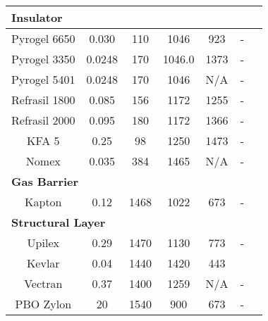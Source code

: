 \begin{table}[ht]
\begin{tabular}{|c|c|c|c|c|c|c|}
		\multicolumn{6}{|l|}{\textbf{Insulator}}			\\ \hline
		Pyrogel 6650      & 0.030                                                 & 110                                        & 1046                                            & 923    & - \\ \hline
		Pyrogel 3350      & 0.0248                                                & 170                                        & 1046.0                                         & 1373  	 & - \\ \hline
		Pyrogel 5401      & 0.0248                                                & 170                                        & 1046                                            & N/A  	 & - \\ \hline
		Refrasil 1800      & 0.085                                                 & 156                                        & 1172                                            & 1255 	 & - \\ \hline
		Refrasil 2000      & 0.095                                                 & 180                                        & 1172                                            & 1366 	 & - \\ \hline
		KFA 5             & 0.25                                                  & 98                                         & 1250                                            & 1473 	 & - \\ \hline
		Nomex             & 0.035                                                  & 384                                         & 1465                                            & N/A 	 & - \\ \hline
		\multicolumn{6}{|l|}{\textbf{Gas Barrier}}			\\ \hline
		Kapton            & 0.12                                                  & 1468                                       & 1022                                            & 673	 & - \\ \hline
		\multicolumn{6}{|l|}{\textbf{Structural Layer}}			\\ \hline
		Upilex            & 0.29                                                  & 1470                                       & 1130                                            & 773 	 & - \\ \hline
		Kevlar            & 0.04 & 1440                                       & 1420                                            & 443 	 & ~ \\ \hline
		Vectran            & 0.37 & 1400 & 1259 & N/A 	 & -\\ \hline
		PBO Zylon			& 20			& 1540	& 900	& 673	& -\\ \hline
	\end{tabular}
	\label{tab:tpsmatprop2}
\end{table}
